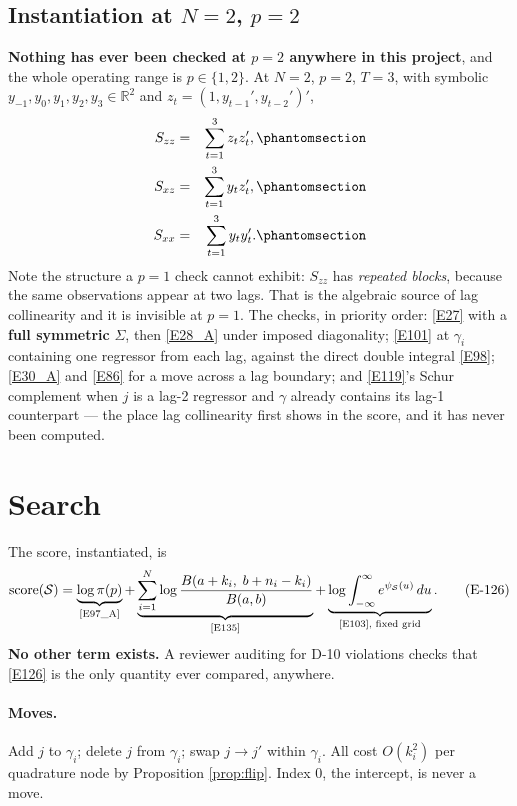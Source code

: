 \subsection{Instantiation at $N=2$, $p=2$}\label{sec:inst}

\textbf{Nothing has ever been checked at $p=2$ anywhere in this project}, and the
whole operating range is $p\in\{1,2\}$. At $N=2$, $p=2$, $T=3$, with symbolic
$y_{-1},y_0,y_1,y_2,y_3\in\mathbb{R}^2$ and $z_t=(1,y_{t-1}',y_{t-2}')'$,
\begin{eqnarray}
S_{zz} &=& \sum_{t=1}^{3} z_t z_t',
  \Elabel{E-123A}{E123_A} \\
S_{xz} &=& \sum_{t=1}^{3} y_t z_t',
  \Elabel{E-123B}{E123_B} \\
S_{xx} &=& \sum_{t=1}^{3} y_t y_t'.
  \Elabel{E-123C}{E123_C}
\end{eqnarray}
Note the structure a $p=1$ check cannot exhibit: $S_{zz}$ has \emph{repeated blocks},
because the same observations appear at two lags. That is the algebraic source of lag
collinearity and it is invisible at $p=1$. The checks, in priority order:
\eqref{E27} with a \textbf{full symmetric} $\Sigma$, then \eqref{E28_A} under imposed
diagonality; \eqref{E101} at $\gamma_i$ containing one regressor from each lag,
against the direct double integral \eqref{E98}; \eqref{E30_A} and \eqref{E86} for a move
across a lag boundary; and \eqref{E119}'s Schur complement when $j$ is a lag-2
regressor and $\gamma$ already contains its lag-1 counterpart --- the place lag
collinearity first shows in the score, and it has never been computed.


\section{Search}\label{sec:search}

The score, instantiated, is
\begin{equation}
\operatorname{score}(\mathcal{S}) = \underbrace{\log\pi(p)}_{\text{\eqref{E97_A}}}
+ \underbrace{\sum_{i=1}^{N}\log\frac{B(a+k_i,\;b+n_i-k_i)}{B(a,b)}}_{\text{\eqref{E135}}}
+ \underbrace{\log\int_{-\infty}^{\infty}e^{\psi_{\mathcal{S}}(u)}\,du}_{\text{\eqref{E103}, fixed grid}}.
\tag{E-126}\label{E126}
\end{equation}
\textbf{No other term exists.} A reviewer auditing for D-10 violations checks that
\eqref{E126} is the only quantity ever compared, anywhere.

\paragraph{Moves.} Add $j$ to $\gamma_i$; delete $j$ from $\gamma_i$; swap
$j\to j'$ within $\gamma_i$. All cost $O(k_i^2)$ per quadrature node by Proposition
\ref{prop:flip}. Index 0, the intercept, is never a move.

